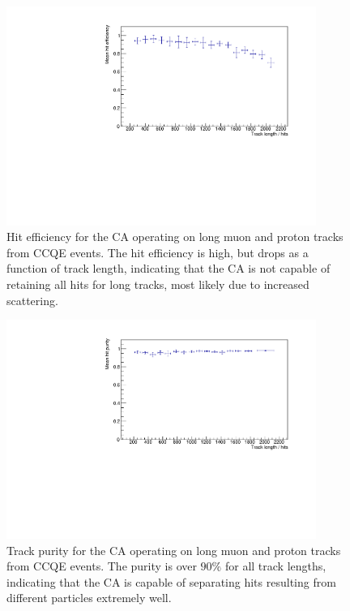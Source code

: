 \begin{figure}
    \centering
    \includegraphics[angle=-90,width=0.9\textwidth]{chapters/cellularautomaton_images/ccqe-reduced-hit-efficiency}
    \caption[Hit efficiency for CA operating on long muon and proton tracks]{\label{fig:ca-ccqe-reduced-eff-pur-efficiency}Hit efficiency for the \ac{CA} operating on long muon and proton tracks from CCQE events. The hit efficiency is high, but drops as a function of track length, indicating that the \ac{CA} is not capable of retaining all hits for long tracks, most likely due to increased scattering.}
\end{figure}

\begin{figure}
    \centering
    \includegraphics[angle=-90,width=0.9\textwidth]{chapters/cellularautomaton_images/ccqe-reduced-cluster-purity}
    \caption[Track purity for CA operating on long muon and proton tracks]{\label{fig:ca-ccqe-reduced-eff-pur-purity}Track purity for the \ac{CA} operating on long muon and proton tracks from CCQE events. The purity is over $90\%$ for all track lengths, indicating that the \ac{CA} is capable of separating hits resulting from different particles extremely well.}
\end{figure}

